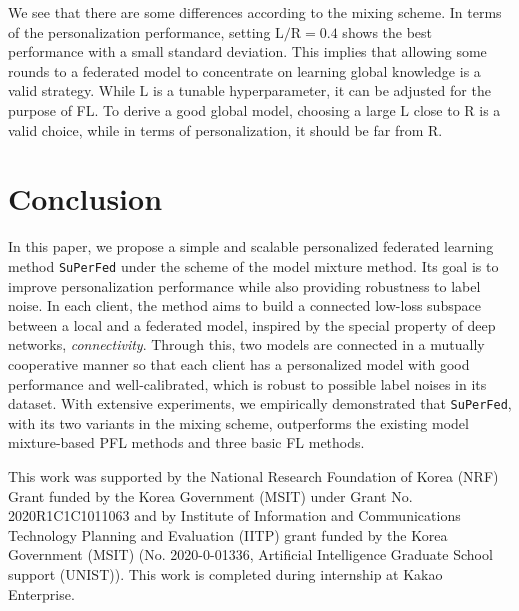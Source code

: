 \documentclass[sigconf]{acmart}
\begin{document}
We see that there are some differences according to the mixing scheme. In terms of the personalization performance, setting $\mathrm{L}/\mathrm{R}=0.4$ shows the best performance with a small standard deviation. This implies that allowing some rounds to a federated model to concentrate on learning global knowledge is a valid strategy. While $\mathrm{L}$ is a tunable hyperparameter, it can be adjusted for the purpose of FL. To derive a good global model, choosing a large $\mathrm{L}$ close to $\mathrm{R}$ is a valid choice, while in terms of personalization, it should be far from $\mathrm{R}$.

\section{Conclusion}
In this paper, we propose a simple and scalable personalized federated learning method \texttt{SuPerFed} under the scheme of the model mixture method. Its goal is to improve personalization performance while also providing robustness to label noise. In each client, the method aims to build a connected low-loss subspace between a local and a federated model, inspired by the special property of deep networks, \textit{connectivity}. Through this, two models are connected in a mutually cooperative manner so that each client has a personalized model with good performance and well-calibrated, which is robust to possible label noises in its dataset. With extensive experiments, we empirically demonstrated that \texttt{SuPerFed}, with its two variants in the mixing scheme, outperforms the existing model mixture-based PFL methods and three basic FL methods.

\begin{acks}
This work was supported by the National Research Foundation of Korea (NRF) Grant funded by the Korea Government (MSIT) under Grant No. 2020R1C1C1011063 and by Institute of Information and Communications Technology Planning and Evaluation (IITP) grant funded by the Korea Government (MSIT) (No. 2020-0-01336, Artificial Intelligence Graduate School support (UNIST)). This work is completed during internship at Kakao Enterprise.
\end{acks}




\clearpage
\appendix
\setcounter{table}{0}
\renewcommand{\thetable}{A\arabic{table}}
\setcounter{figure}{0}
\renewcommand{\thefigure}{A\arabic{figure}}
\end{document}
